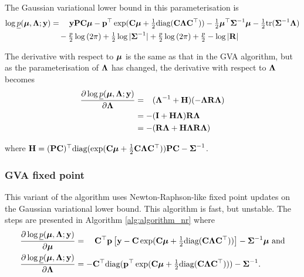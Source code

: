 \documentclass{article}[12pt]
\begin{document}
	
	\noindent The Gaussian variational lower bound in this parameterisation is
	\begin{align*}
		\log \underline{p}({\boldsymbol \mu}, {\boldsymbol \Lambda}; {\bf y}) & = \quad {\bf y}{\bf P}{\bf C} {\boldsymbol\mu} - {\bf p}^\top \exp({\bf C} {\boldsymbol \mu} + \tfrac{1}{2} \text{diag}({\bf C} {\boldsymbol \Lambda} {\bf C}^\top)) - \tfrac{1}{2} {\boldsymbol \mu}^\top {\boldsymbol\Sigma}^{-1} {\boldsymbol \mu} - \tfrac{1}{2} \text{tr}{({\boldsymbol\Sigma}^{-1} {\boldsymbol\Lambda})} \\
		                                        & \quad- \tfrac{p}{2} \log{(2 \pi)} + \tfrac{1}{2} \log{|{\boldsymbol\Sigma}^{-1}|} + \tfrac{p}{2} \log{(2 \pi)} + \tfrac{p}{2} - \log{|{\bf R}|}                                             
	\end{align*}
	
	\noindent The derivative with respect to ${\boldsymbol \mu}$ is the same as that in the GVA algorithm, but as the parameterisation of
	${\boldsymbol \Lambda}$ has changed, the  derivative with respect to ${\boldsymbol \Lambda}$ becomes
	\begin{align*}
		\frac{\partial \log \underline{p}({\boldsymbol \mu}, {\boldsymbol \Lambda}; {\bf y})}{\partial {\boldsymbol\Lambda}}
		  & = \hphantom{-}({\boldsymbol \Lambda}^{-1} + {\bf H})(-{\boldsymbol \Lambda} {\bf R} {\boldsymbol \Lambda}) \\
		  & = -({\bf I} + {\bf H}{\boldsymbol \Lambda}){\bf R}{\boldsymbol \Lambda}                           \\
		  & = - ({\bf R}{\boldsymbol \Lambda} + {\bf H}{\boldsymbol \Lambda}{\bf R}{\boldsymbol \Lambda})                  
	\end{align*} 
	
	\noindent where ${\bf H} = ({\bf P} {\bf C})^\top \text{diag}(\exp({\bf C} {\boldsymbol \mu} + \tfrac{1}{2} {\bf C} {\boldsymbol \Lambda} {\bf C}^\top)) {\bf P} {\bf C} - {\boldsymbol \Sigma}^{-1}$.
	
	\subsubsection{GVA fixed point}
	
	
	This variant of the algorithm uses Newton-Raphson-like fixed point updates on the Gaussian variational lower
	bound. This algorithm is fast, but unstable. The steps are presented in Algorithm \ref{alg:algorithm_nr} where
	\begin{align*}
		\frac{\partial \log \underline{p}({\boldsymbol \mu}, {\boldsymbol \Lambda}; {\bf y})}{\partial {\boldsymbol\mu}}     & = \quad {\bf C}^\top{\bf p} \left [{\bf y} - {\bf C}\exp({\bf C} {\boldsymbol \mu} + \tfrac{1}{2} \text{diag}({\bf C} {\boldsymbol \Lambda} {\bf C}^\top)) \right ] - {\boldsymbol \Sigma}^{-1} {\boldsymbol \mu} \text{ and} \\
		\frac{\partial \log \underline{p}({\boldsymbol \mu}, {\boldsymbol \Lambda}; {\bf y})}{\partial {\boldsymbol\Lambda}} & = -{\bf C}^\top \text{diag}({\bf p}^\top \exp({\bf C} {\boldsymbol \mu} +\tfrac{1}{2} \text{diag}({\bf C} {\boldsymbol \Lambda} {\bf C}^\top))) - {\boldsymbol \Sigma}^{-1}.                             
	\end{align*}
	
\end{document}
